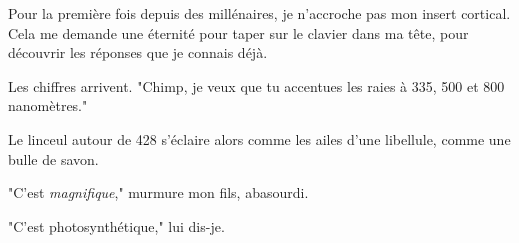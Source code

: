 Pour la première fois depuis des millénaires, je n'accroche pas mon insert cortical. Cela me demande une éternité pour taper sur le clavier dans ma tête, pour découvrir les réponses que je connais déjà.

Les chiffres arrivent. "Chimp, je veux que tu accentues les raies à 335, 500 et 800 nanomètres."

Le linceul autour de 428 s'éclaire alors comme les ailes d'une libellule, comme une bulle de savon.

"C'est \emph{magnifique}," murmure mon fils, abasourdi.

"C'est photosynthétique," lui dis-je.